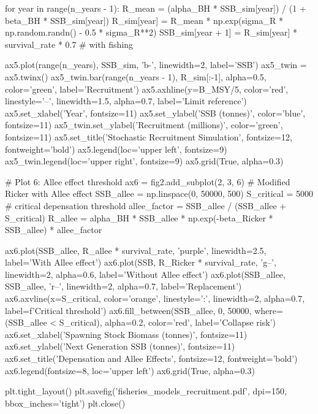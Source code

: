\documentclass[a4paper, 11pt]{article}
\begin{document}
\begin{pycode}
for year in range(n_years - 1):
    R_mean = (alpha_BH * SSB_sim[year]) / (1 + beta_BH * SSB_sim[year])
    R_sim[year] = R_mean * np.exp(sigma_R * np.random.randn() - 0.5 * sigma_R**2)
    SSB_sim[year + 1] = R_sim[year] * survival_rate * 0.7  # with fishing

ax5.plot(range(n_years), SSB_sim, 'b-', linewidth=2, label='SSB')
ax5_twin = ax5.twinx()
ax5_twin.bar(range(n_years - 1), R_sim[:-1], alpha=0.5, color='green', label='Recruitment')
ax5.axhline(y=B_MSY/5, color='red', linestyle='--', linewidth=1.5, alpha=0.7,
            label='Limit reference')
ax5.set_xlabel('Year', fontsize=11)
ax5.set_ylabel('SSB (tonnes)', color='blue', fontsize=11)
ax5_twin.set_ylabel('Recruitment (millions)', color='green', fontsize=11)
ax5.set_title('Stochastic Recruitment Simulation', fontsize=12, fontweight='bold')
ax5.legend(loc='upper left', fontsize=9)
ax5_twin.legend(loc='upper right', fontsize=9)
ax5.grid(True, alpha=0.3)

# Plot 6: Allee effect threshold
ax6 = fig2.add_subplot(2, 3, 6)
# Modified Ricker with Allee effect
SSB_allee = np.linspace(0, 50000, 500)
S_critical = 5000  # critical depensation threshold
allee_factor = SSB_allee / (SSB_allee + S_critical)
R_allee = alpha_BH * SSB_allee * np.exp(-beta_Ricker * SSB_allee) * allee_factor

ax6.plot(SSB_allee, R_allee * survival_rate, 'purple', linewidth=2.5,
         label='With Allee effect')
ax6.plot(SSB, R_Ricker * survival_rate, 'g--', linewidth=2, alpha=0.6,
         label='Without Allee effect')
ax6.plot(SSB_allee, SSB_allee, 'r--', linewidth=2, alpha=0.7, label='Replacement')
ax6.axvline(x=S_critical, color='orange', linestyle=':', linewidth=2, alpha=0.7,
            label=f'Critical threshold')
ax6.fill_between(SSB_allee, 0, 50000, where=(SSB_allee < S_critical),
                  alpha=0.2, color='red', label='Collapse risk')
ax6.set_xlabel('Spawning Stock Biomass (tonnes)', fontsize=11)
ax6.set_ylabel('Next Generation SSB (tonnes)', fontsize=11)
ax6.set_title('Depensation and Allee Effects', fontsize=12, fontweight='bold')
ax6.legend(fontsize=8, loc='upper left')
ax6.grid(True, alpha=0.3)

plt.tight_layout()
plt.savefig('fisheries_models_recruitment.pdf', dpi=150, bbox_inches='tight')
plt.close()
\end{pycode}
\end{document}
